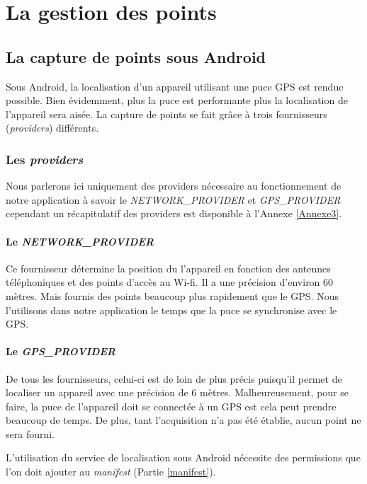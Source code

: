 \chapter{La gestion des points}

\section{La capture de points sous Android}
Sous Android, la localisation d'un appareil utilisant une puce GPS est rendue possible. Bien évidemment, plus la puce est performante plus la localisation de l’appareil sera aisée. La capture de points se fait grâce à trois fournisseurs (\textit{providers}) différents.

\subsection{Les \textit{providers}}
Nous parlerons ici uniquement des providers nécessaire au fonctionnement de notre application à savoir le \textit{NETWORK\_PROVIDER} et \textit{GPS\_PROVIDER} cependant un récapitulatif des providers est disponible à l'Annexe \ref{Annexe3}.

\subsubsection{Le \textit{NETWORK\_PROVIDER}}
Ce fournisseur détermine la position du l'appareil en fonction des antennes téléphoniques et des points d'accès au Wi-fi. Il a une précision d'environ 60 mètres. Mais fournis des points beaucoup plus rapidement que le GPS. Nous l'utilisons dans notre application le temps que la puce se synchronise avec le GPS.

\subsubsection{Le \textit{GPS\_PROVIDER}}
De tous les fournisseurs, celui-ci est de loin de plus précis puisqu'il permet de localiser un appareil avec une précision de 6 mètres. Malheureusement, pour se faire, la puce de l'appareil doit se connectée à un GPS est cela peut prendre beaucoup de temps. De plus, tant l'acquisition n'a pas été établie, aucun point ne sera fourni.

\begin{note}
L'utilisation du service de localisation sous Android nécessite des permissions que l'on doit ajouter au \textit{manifest} (Partie \ref{manifest}).
\end{note}

